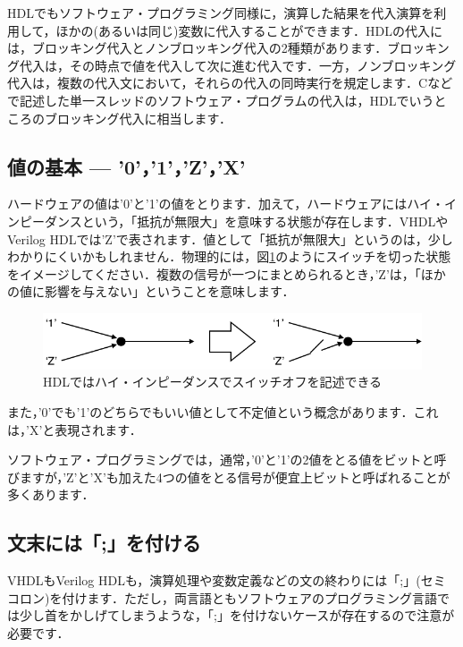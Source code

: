 \documentclass[a4paper,dvipdfmx]{jsarticle}
\begin{document}
HDLでもソフトウェア・プログラミング同様に，演算した結果を代入演算を利用して，ほかの(あるいは同じ)変数に代入することができます．HDLの代入には，ブロッキング代入とノンブロッキング代入の2種類があります．ブロッキング代入は，その時点で値を代入して次に進む代入です．一方，ノンブロッキング代入は，複数の代入文において，それらの代入の同時実行を規定します．Cなどで記述した単一スレッドのソフトウェア・プログラムの代入は，HDLでいうところのブロッキング代入に相当します．

\subsection{値の基本 --- '0'，'1'，'Z'，'X'}
ハードウェアの値は'0'と'1'の値をとります．加えて，ハードウェアにはハイ・インピーダンスという，「抵抗が無限大」を意味する状態が存在します．VHDLやVerilog HDLでは'Z'で表されます．値として「抵抗が無限大」というのは，少しわかりにくいかもしれません．物理的には，図\ref{fig:high_imp_image}のようにスイッチを切った状態をイメージしてください．複数の信号が一つにまとめられるとき，'Z'は，「ほかの値に影響を与えない」ということを意味します．

 \begin{figure}[H]
  \begin{center}
   \includegraphics[width=.65\textwidth]{chapter02_figures/high_imp_image.png}
  \end{center}
  \caption{HDLではハイ・インピーダンスでスイッチオフを記述できる \label{fig:high_imp_image}}
 \end{figure}

また，'0'でも'1'のどちらでもいい値として不定値という概念があります．これは，'X'と表現されます．

ソフトウェア・プログラミングでは，通常，'0'と'1'の2値をとる値をビットと呼びますが，'Z'と'X'も加えた4つの値をとる信号が便宜上ビットと呼ばれることが多くあります．

\subsection{文末には「;」を付ける}
VHDLもVerilog HDLも，演算処理や変数定義などの文の終わりには「;」(セミコロン)を付けます．ただし，両言語ともソフトウェアのプログラミング言語では少し首をかしげてしまうような，「;」を付けないケースが存在するので注意が必要です．
\end{document}

